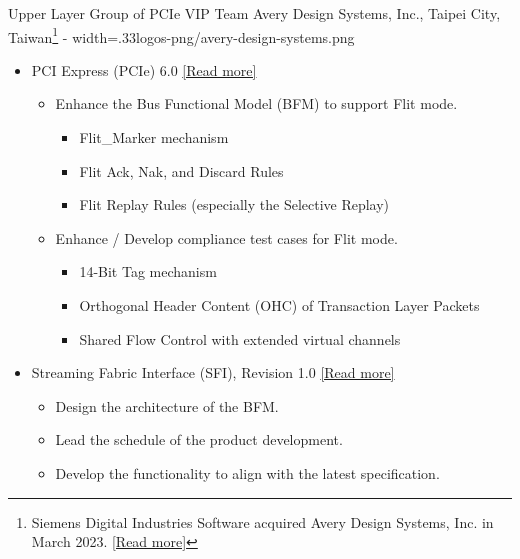 \documentclass{cvclass}
\newcommand{\simplemmyy}[3]{\shortmmyyformat\formatdate{#3}{#2}{#1}}
\begin{document}
    {Upper Layer Group of PCIe VIP Team}
    {Avery Design Systems, Inc., Taipei City, Taiwan\footnote{Siemens Digital Industries Software acquired Avery Design Systems, Inc. in March 2023. \href{https://newsroom.sw.siemens.com/en-US/siemens-avery-design-systems/}{[Read more]}}}
    {\simplemmyy{2021}{7}{19} - \simplemmyy{2023}{4}{10}}
    {width=.33\linewidth}{logos-png/avery-design-systems.png}
    {\begin{itemize}
        \item PCI Express\textsuperscript{\tiny\textregistered} (PCIe\textsuperscript{\tiny\textregistered}) 6.0 \href{https://pcisig.com/pci-express-6.0-specification}{[Read more]}
        \begin{itemize}
            \item Enhance the Bus Functional Model (BFM) to support Flit mode.
            \begin{itemize}
                \item Flit\_Marker mechanism
                \item Flit Ack, Nak, and Discard Rules
                \item Flit Replay Rules (especially the Selective Replay)
            \end{itemize}
            \item Enhance / Develop compliance test cases for Flit mode.
            \begin{itemize}
                \item 14-Bit Tag mechanism
                \item Orthogonal Header Content (OHC) of Transaction Layer Packets
                \item Shared Flow Control with extended virtual channels
            \end{itemize}
        \end{itemize}
        \item Streaming Fabric Interface (SFI), Revision 1.0 \href{https://www.intel.com/content/www/us/en/content-details/644200/streaming-fabric-interface-sfi-specification.html}{[Read more]}
        \begin{itemize}
            \item Design the architecture of the BFM.
            \item Lead the schedule of the product development.
            \item Develop the functionality to align with the latest specification.

\end{itemize}
\end{itemize}}
\end{document}
